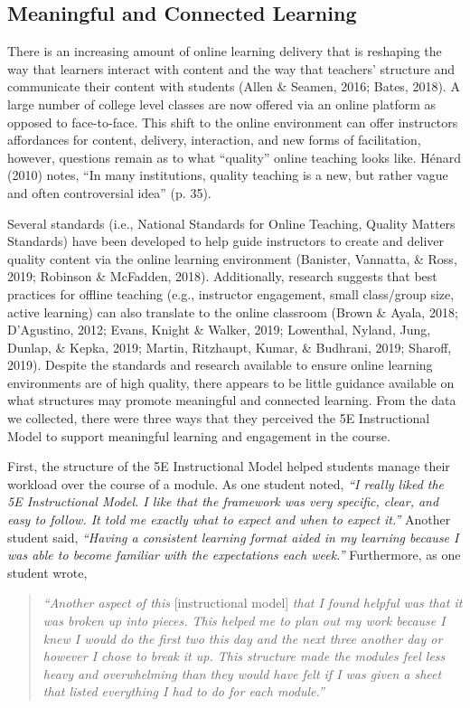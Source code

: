 \documentclass[11.5pt]{sig-alternate} %
\begin{document}
\begin{large}
\subsection*{Meaningful and Connected Learning}

There is an increasing amount of online learning delivery that is reshaping the way that learners interact with content and the way that teachers’ structure and communicate their content with students (Allen \& Seamen, 2016; Bates, 2018). A large number of college level classes are now offered via an online platform as opposed to face-to-face. This shift to the online environment can offer instructors affordances for content, delivery, interaction, and new forms of facilitation, however, questions remain as to what “quality” online teaching looks like. Hénard (2010) notes, “In many institutions, quality teaching is a new, but rather vague and often controversial idea” (p. 35).  

Several standards (i.e., National Standards for Online Teaching, Quality Matters Standards) have been developed to help guide instructors to create and deliver quality content via the online learning environment (Banister, Vannatta, \& Ross, 2019; Robinson \& McFadden, 2018). Additionally, research suggests that best practices for offline teaching (e.g., instructor engagement, small class/group size, active learning) can also translate to the online classroom (Brown \& Ayala, 2018; D'Agustino, 2012; Evans, Knight \& Walker, 2019; Lowenthal, Nyland, Jung, Dunlap, \& Kepka, 2019; Martin, Ritzhaupt, Kumar, \& Budhrani, 2019; Sharoff, 2019). Despite the standards and research available to ensure online learning environments are of high quality, there appears to be little guidance available on what structures may promote meaningful and connected learning. From the data we collected, there were three ways that they perceived the 5E Instructional Model to support meaningful learning and engagement in the course. 

First, the structure of the 5E Instructional Model helped students manage their workload over the course of a module. As one student noted, \textit{“I really liked the 5E Instructional Model. I like that the framework was very specific, clear, and easy to follow. It told me exactly what to expect and when to expect it.”} Another student said, \textit{“Having a consistent learning format aided in my learning because I was able to become familiar with the expectations each week.”} Furthermore, as one student wrote, 
\begin{quote}
    \textit{“Another aspect of this} [instructional model] \textit{that I found helpful was that it was broken up into pieces. This helped me to plan out my work because I knew I would do the first two this day and the next three another day or however I chose to break it up. This structure made the modules feel less heavy and overwhelming than they would have felt if I was given a sheet that listed everything I had to do for each module.”}
\end{quote}


\end{large}
\end{document}

